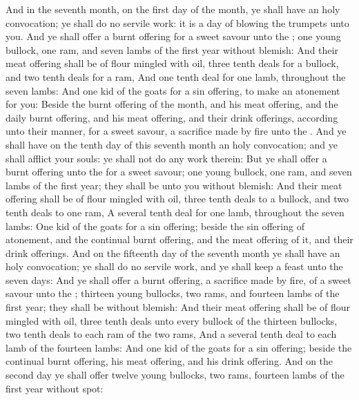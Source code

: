 \begin{biblechapter} %
 And in the seventh month, on the first day of the month, ye shall have an holy convocation; ye shall do no servile work: it is a day of blowing the trumpets unto you.
\verse And ye shall offer a burnt offering for a sweet savour unto the \LORD; one young bullock, one ram, and seven lambs of the first year without blemish:
\verse And their meat offering shall be of flour mingled with oil, three tenth deals for a bullock, and two tenth deals for a ram,
\verse And one tenth deal for one lamb, throughout the seven lambs:
\verse And one kid of the goats for a sin offering, to make an atonement for you:
\verse Beside the burnt offering of the month, and his meat offering, and the daily burnt offering, and his meat offering, and their drink offerings, according unto their manner, for a sweet savour, a sacrifice made by fire unto the \LORD.
 And ye shall have on the tenth day of this seventh month an holy convocation; and ye shall afflict your souls: ye shall not do any work therein:
\verse But ye shall offer a burnt offering unto the \LORD for a sweet savour; one young bullock, one ram, and seven lambs of the first year; they shall be unto you without blemish:
\verse And their meat offering shall be of flour mingled with oil, three tenth deals to a bullock, and two tenth deals to one ram,
\verse A several tenth deal for one lamb, throughout the seven lambs:
\verse One kid of the goats for a sin offering; beside the sin offering of atonement, and the continual burnt offering, and the meat offering of it, and their drink offerings.
 And on the fifteenth day of the seventh month ye shall have an holy convocation; ye shall do no servile work, and ye shall keep a feast unto the \LORD seven days:
\verse And ye shall offer a burnt offering, a sacrifice made by fire, of a sweet savour unto the \LORD; thirteen young bullocks, two rams, and fourteen lambs of the first year; they shall be without blemish:
\verse And their meat offering shall be of flour mingled with oil, three tenth deals unto every bullock of the thirteen bullocks, two tenth deals to each ram of the two rams,
\verse And a several tenth deal to each lamb of the fourteen lambs:
\verse And one kid of the goats for a sin offering; beside the continual burnt offering, his meat offering, and his drink offering.
\verse And on the second day ye shall offer twelve young bullocks, two rams, fourteen lambs of the first year without spot:

\end{biblechapter}
